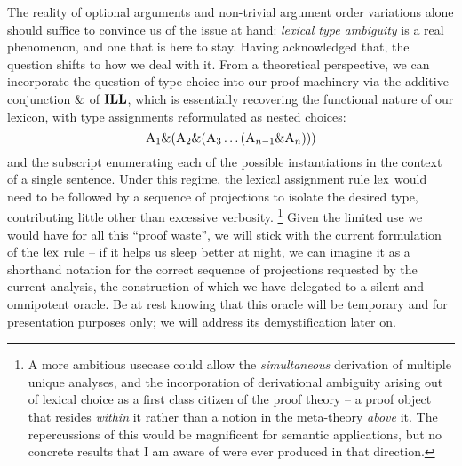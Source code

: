 The reality of optional arguments and non-trivial argument order variations alone should suffice to convince us of the issue at hand: \textit{lexical type ambiguity} is a real phenomenon, and one that is here to stay.
Having acknowledged that, the question shifts to how we deal with it.
From a theoretical perspective, we can incorporate the question of type choice into our proof-machinery via the additive conjunction ${\&}$ of $\textbf{ILL}$, which is essentially recovering the functional nature of our lexicon, with type assignments reformulated as nested choices:
\begin{equation}
 \normalfont\textsc{A}_1 {\&} (\normalfont\textsc{A}_2 {\&} (\normalfont\textsc{A}_3 \dots (\normalfont\textsc{A}_{n-1}{\&}\normalfont\textsc{A}_{n})))
\end{equation}
and the subscript enumerating each of the possible instantiations in the context of a single sentence.
Under this regime, the lexical assignment rule $\mathrm{lex}$ would need to be followed by a sequence of projections to isolate the desired type, contributing little other than excessive verbosity.%
\footnote{
A more ambitious usecase could allow the \textit{simultaneous} derivation of multiple unique analyses, and the incorporation of derivational ambiguity arising out of lexical choice as a first class citizen of the proof theory -- a proof object that resides \textit{within} it rather than a notion in the meta-theory \textit{above} it.
The repercussions of this would be magnificent for semantic applications, but no concrete results that I am aware of were ever produced in that direction.}
Given the limited use we would have for all this ``proof waste'', we will stick with the current formulation of the $\mathrm{lex}$ rule -- if it helps us sleep better at night, we can imagine it as a shorthand notation for the correct sequence of projections requested by the current analysis, the construction of which we have delegated to a silent and omnipotent oracle.
Be at rest knowing that this oracle will be temporary and for presentation purposes only; we will address its demystification later on.

